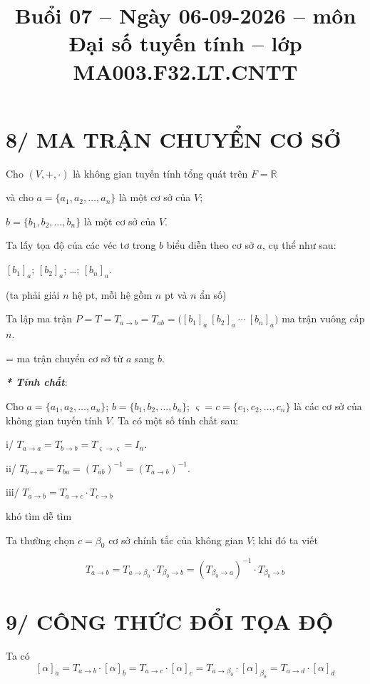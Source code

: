 \documentclass[12pt,a4paper]{article}
\title{Buổi 07 -- Ngày 06-09-2026 -- môn Đại số tuyến tính -- lớp MA003.F32.LT.CNTT}
\date{}
\author{}
\newcommand{\R}{\mathbb{R}}
\begin{document}
\maketitle

\section*{8/ MA TRẬN CHUYỂN CƠ SỞ}

Cho $(V,+,\cdot)$ là không gian tuyến tính tổng quát trên $F=\R$

và cho $a=\{a_1,a_2,\ldots,a_n\}$ là một cơ sở của $V$;

$b=\{b_1,b_2,\ldots,b_n\}$ là một cơ sở của $V$.

Ta lấy tọa độ của các véc tơ trong $b$ biểu diễn theo cơ sở $a$, cụ thể như sau:

$[b_1]_a$; $[b_2]_a$; \ldots; $[b_n]_a$.

(ta phải giải $n$ hệ pt, mỗi hệ gồm $n$ pt và $n$ ẩn số)

Ta lập ma trận $P=T=T_{a\to b}=T_{ab}=\big([b_1]_a \ [b_2]_a \ \cdots \ [b_n]_a\big)$ ma trận vuông cấp $n$.

= ma trận chuyển cơ sở từ $a$ sang $b$.

\medskip
\noindent\textbf{\textit{* Tính chất}}:

Cho $a=\{a_1,a_2,\ldots,a_n\}$; $b=\{b_1,b_2,\ldots,b_n\}$; $\varsigma=c=\{c_1,c_2,\ldots,c_n\}$ là các cơ sở của không gian tuyến tính $V$. Ta có một số tính chất sau:

i/ $T_{a\to a}=T_{b\to b}=T_{\varsigma\to\varsigma}=I_n$.

ii/ $T_{b\to a}=T_{ba}=(T_{ab})^{-1}=(T_{a\to b})^{-1}$.

iii/ $T_{a\to b}=T_{a\to c}\cdot T_{c\to b}$

\hfill khó tìm \hfill dễ tìm

Ta thường chọn $c=\beta_0$ cơ sở chính tắc của không gian $V$; khi đó ta viết

\[
T_{a\to b}=T_{a\to \beta_0}\cdot T_{\beta_0\to b}=(T_{\beta_0\to a})^{-1}\cdot T_{\beta_0\to b}
\]

\section*{9/ CÔNG THỨC ĐỔI TỌA ĐỘ}

Ta có
\[
[\alpha]_a=T_{a\to b}\cdot[\alpha]_b=T_{a\to c}\cdot[\alpha]_c=T_{a\to\beta_0}\cdot[\alpha]_{\beta_0}=T_{a\to d}\cdot[\alpha]_d
\]
\end{document}
